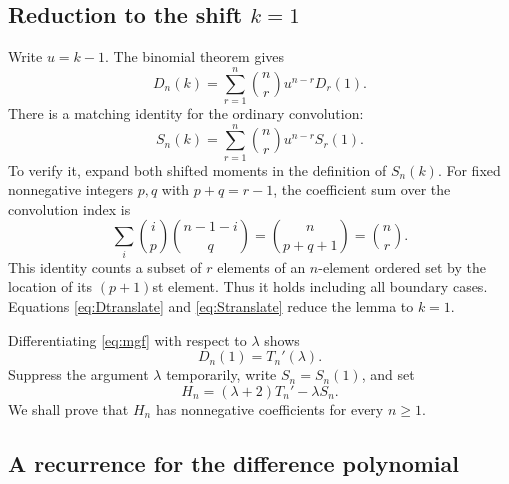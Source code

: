 \documentclass[11pt]{article}
\numberwithin{equation}{section}
\theoremstyle{remark}
\begin{document}
\subsection{Reduction to the shift \texorpdfstring{$k=1$}{k=1}}

Write $u=k-1$. The binomial theorem gives
\begin{equation}\label{eq:Dtranslate}
 D_n(k)=\sum_{r=1}^n\binom nr u^{n-r}D_r(1).
\end{equation}
There is a matching identity for the ordinary convolution:
\begin{equation}\label{eq:Stranslate}
 S_n(k)=\sum_{r=1}^n\binom nr u^{n-r}S_r(1).
\end{equation}
To verify it, expand both shifted moments in the definition of $S_n(k)$.
For fixed nonnegative integers $p,q$ with $p+q=r-1$, the coefficient
sum over the convolution index is
\[
 \sum_i\binom ip\binom{n-1-i}q=\binom n{p+q+1}=\binom nr.
\]
This identity counts a subset of $r$ elements of an $n$-element ordered
set by the location of its $(p+1)$st element. Thus it holds including
all boundary cases. Equations \eqref{eq:Dtranslate} and
\eqref{eq:Stranslate} reduce the lemma to $k=1$.

Differentiating \eqref{eq:mgf} with respect to $\lambda$ shows
\begin{equation}\label{eq:Dderivative}
 D_n(1)=T_n'(\lambda).
\end{equation}
Suppress the argument $\lambda$ temporarily, write $S_n=S_n(1)$, and set
\begin{equation}\label{eq:H}
 H_n=(\lambda+2)T_n'-\lambda S_n.
\end{equation}
We shall prove that $H_n$ has nonnegative coefficients for every $n\ge1$.

\subsection{A recurrence for the difference polynomial}
\end{document}
